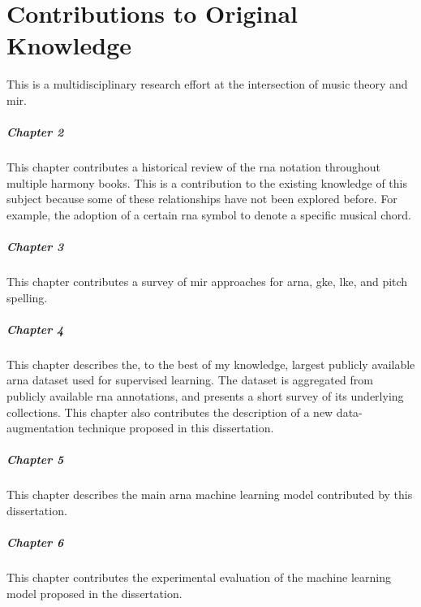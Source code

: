 \chapter*{Contributions to Original Knowledge}
\label{chap:contributionstoknowledge}

This \thesisdiss{} is a multidisciplinary research effort at
the intersection of music theory and \gls{mir}.

\paragraph{Chapter 2}

This chapter contributes a historical review of the
\gls{rna} notation throughout multiple harmony books. This
is a contribution to the existing knowledge of this subject
because some of these relationships have not been explored
before. For example, the adoption of a certain \gls{rna}
symbol to denote a specific musical chord.

\paragraph{Chapter 3}

This chapter contributes a survey of \gls{mir} approaches
for \gls{arna}, \gls{gke}, \gls{lke}, and pitch spelling. 

\paragraph{Chapter 4}

This chapter describes the, to the best of my knowledge,
largest publicly available \gls{arna} dataset used for
supervised learning. The dataset is aggregated from publicly
available \gls{rna} annotations, and presents a short survey
of its underlying collections. This chapter also contributes
the description of a new data-augmentation technique
proposed in this dissertation.

\paragraph{Chapter 5}

This chapter describes the main \gls{arna} machine learning
model contributed by this dissertation.

\paragraph{Chapter 6}

This chapter contributes the experimental evaluation of the
machine learning model proposed in the dissertation. 
